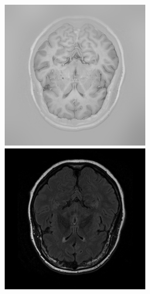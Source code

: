 \documentclass[runningheads,a4paper]{llncs}
\begin{document}
\begin{figure}
\begin{minipage}{.24\textwidth}
  \end{minipage}
  \begin{minipage}{.24\textwidth}
 \includegraphics[width=.99\linewidth]{./images/sl19-v10-test-t1-ir.png}
  \end{minipage}
  \begin{minipage}{.24\textwidth}
 \includegraphics[width=.99\linewidth]{./images/sl19-v10-test-t2-flair.png}
  \end{minipage}
  

\end{figure}
\end{document}
